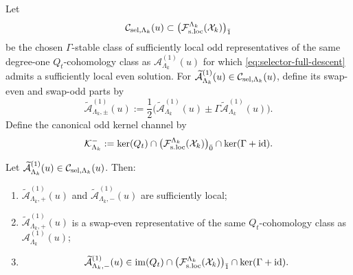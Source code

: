 \documentclass[11pt]{article}
\begin{document}
\begin{definition}
\label{def:selector-class}
Let
\[
\mathcal C_{{\rm sel},\Lambda_k}(u)
\subset
\big(\mathcal F_{\rm s.loc}^{\Lambda_k}(\mathcal X_k)\big)_{\bar 1}
\]
be the chosen \(\Gamma\)-stable class of sufficiently local odd representatives of the same
degree-one \(Q_t\)-cohomology class as \(\mathcal A^{(1)}_{\Lambda_k}(u)\) for which
\eqref{eq:selector-full-descent} admits a sufficiently local even solution.
For
\(
\widetilde{\mathcal A}^{(1)}_{\Lambda_k}(u)\in\mathcal C_{{\rm sel},\Lambda_k}(u)
\),
define its swap-even and swap-odd parts by
\[
\widetilde{\mathcal A}^{(1)}_{\Lambda_k,\pm}(u)
:=
\frac12\Big(
\widetilde{\mathcal A}^{(1)}_{\Lambda_k}(u)
\pm
\Gamma\widetilde{\mathcal A}^{(1)}_{\Lambda_k}(u)
\Big).
\]
Define the canonical odd kernel channel by
\[
\mathcal K^-_{\Lambda_k}
:=
\ker(Q_t)
\cap
\big(\mathcal F_{\rm s.loc}^{\Lambda_k}(\mathcal X_k)\big)_{\bar 0}
\cap
\ker(\Gamma+\mathrm{id}).
\]
\end{definition}

\begin{proposition}
\label{prop:selector-odd-defect}
Let
\(
\widetilde{\mathcal A}^{(1)}_{\Lambda_k}(u)\in\mathcal C_{{\rm sel},\Lambda_k}(u)
\).
Then:
\begin{enumerate}[leftmargin=2em]
\item
  \(
  \widetilde{\mathcal A}^{(1)}_{\Lambda_k,+}(u)
  \)
  and
  \(
  \widetilde{\mathcal A}^{(1)}_{\Lambda_k,-}(u)
  \)
  are sufficiently local;
\item
  \(
  \widetilde{\mathcal A}^{(1)}_{\Lambda_k,+}(u)
  \)
  is a swap-even representative of the same \(Q_t\)-cohomology class as
  \(\mathcal A^{(1)}_{\Lambda_k}(u)\);
\item
  \[
  \widetilde{\mathcal A}^{(1)}_{\Lambda_k,-}(u)
  \in
  \operatorname{im}(Q_t)
  \cap
  \big(\mathcal F_{\rm s.loc}^{\Lambda_k}(\mathcal X_k)\big)_{\bar 1}
  \cap
  \ker(\Gamma+\mathrm{id}).
  \]
\end{enumerate}
\end{proposition}
\end{document}
